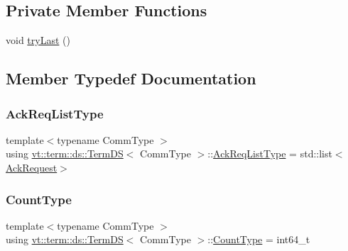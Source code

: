 \subsection*{Private Member Functions}
\begin{DoxyCompactItemize}
\item 
void \hyperlink{structvt_1_1term_1_1ds_1_1_term_d_s_ae568c3c351a353e9ca04764957b5b642}{try\+Last} ()
\end{DoxyCompactItemize}


\subsection{Member Typedef Documentation}
\mbox{\label{structvt_1_1term_1_1ds_1_1_term_d_s_a9d4102aa0577c3b077befc48c1a88842}} 
\subsubsection{\texorpdfstring{Ack\+Req\+List\+Type}{AckReqListType}}
{\footnotesize\ttfamily template$<$typename Comm\+Type $>$ \\
using \hyperlink{structvt_1_1term_1_1ds_1_1_term_d_s}{vt\+::term\+::ds\+::\+Term\+DS}$<$ Comm\+Type $>$\+::\hyperlink{structvt_1_1term_1_1ds_1_1_term_d_s_a9d4102aa0577c3b077befc48c1a88842}{Ack\+Req\+List\+Type} =  std\+::list$<$\hyperlink{structvt_1_1term_1_1ds_1_1_ack_request}{Ack\+Request}$>$}

\mbox{\label{structvt_1_1term_1_1ds_1_1_term_d_s_a54f4ebd7e1ecb59c32c0f5b03ef9f20b}} 
\subsubsection{\texorpdfstring{Count\+Type}{CountType}}
{\footnotesize\ttfamily template$<$typename Comm\+Type $>$ \\
using \hyperlink{structvt_1_1term_1_1ds_1_1_term_d_s}{vt\+::term\+::ds\+::\+Term\+DS}$<$ Comm\+Type $>$\+::\hyperlink{structvt_1_1term_1_1ds_1_1_term_d_s_a54f4ebd7e1ecb59c32c0f5b03ef9f20b}{Count\+Type} =  int64\+\_\+t}



